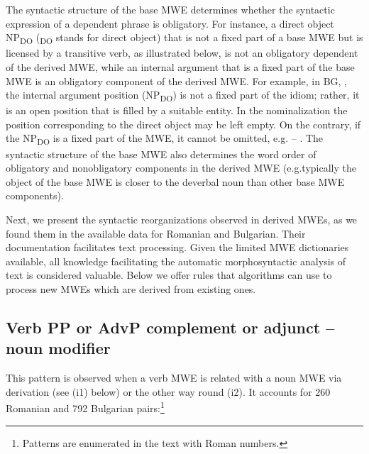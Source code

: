 \documentclass[output=paper]{langsci/langscibook}
\begin{document}
The syntactic structure of the base MWE determines whether the syntactic
expression of a dependent phrase is obligatory. For instance, a direct
object NP\textsubscript{DO} (\textsubscript{DO }stands for direct
object) that is not a fixed part of a base MWE but is licensed by a
transitive verb, as illustrated below, is not an obligatory
dependent of the derived MWE, while an internal argument that is a
fixed part of the base MWE is an obligatory component of the derived
MWE. For example, in BG,  
, the internal argument position (NP\textsubscript{DO}) is
not a fixed part of the idiom; rather, it is an open position that is
filled by a suitable entity. In the nominalization 
 the position
corresponding to the direct object may be left empty. On the contrary, if the NP\textsubscript{DO} is a fixed part of the MWE, it cannot
be omitted, e.g.\@ 
{} -- 
. The syntactic structure of the base MWE also
determines the word order of obligatory and non\textendash obligatory components
in the derived MWE (e.g.\@ typically the object of the base MWE is closer
to the deverbal noun than other base MWE components).



Next, we present the syntactic reorganizations observed in derived MWEs,
as we found them in the available data for Romanian and Bulgarian.
Their documentation facilitates text processing. Given the limited MWE
dictionaries available, all knowledge facilitating the automatic
morphosyntactic analysis of text is considered valuable. Below we offer
rules that algorithms can use to process new MWEs which are derived from existing ones.


\subsection{Verb PP or AdvP complement or adjunct -- noun modifier}
\label{section61}

This pattern is observed when a verb MWE is related with a noun MWE via
 derivation (see (i1) below) or the other way round (i2). It accounts
for 260 Romanian and 792 Bulgarian pairs:\footnote{Patterns are enumerated in the text with Roman numbers.}
\end{document}
